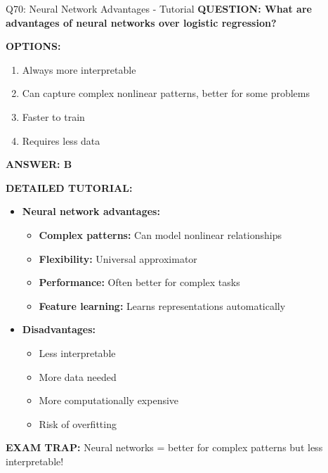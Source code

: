 \documentclass[8pt]{beamer}
\begin{document}
	\begin{frame}{Q70: Neural Network Advantages - Tutorial}
		\fontsize{6.5}{7.5}\selectfont
		\textbf{QUESTION: What are advantages of neural networks over logistic regression?}
		
		\vspace{0.1cm}
		\textbf{OPTIONS:}
		\begin{enumerate}
			\item Always more interpretable
			\item Can capture complex nonlinear patterns, better for some problems
			\item Faster to train
			\item Requires less data
		\end{enumerate}
		
		\vspace{0.1cm}
		\textcolor{myblue}{\textbf{ANSWER: B}}
		
		\vspace{0.1cm}
		\textbf{DETAILED TUTORIAL:}
		\begin{itemize}
			\item \textbf{Neural network advantages:}
			\begin{itemize}
				\item \textbf{Complex patterns:} Can model nonlinear relationships
				\item \textbf{Flexibility:} Universal approximator
				\item \textbf{Performance:} Often better for complex tasks
				\item \textbf{Feature learning:} Learns representations automatically
			\end{itemize}
			\item \textbf{Disadvantages:}
			\begin{itemize}
				\item Less interpretable
				\item More data needed
				\item More computationally expensive
				\item Risk of overfitting
			\end{itemize}
		\end{itemize}
		
		\textcolor{myred}{\textbf{EXAM TRAP:}} Neural networks = \textcolor{myblue}{better for complex patterns} but less interpretable!
	\end{frame}
	
\end{document}
